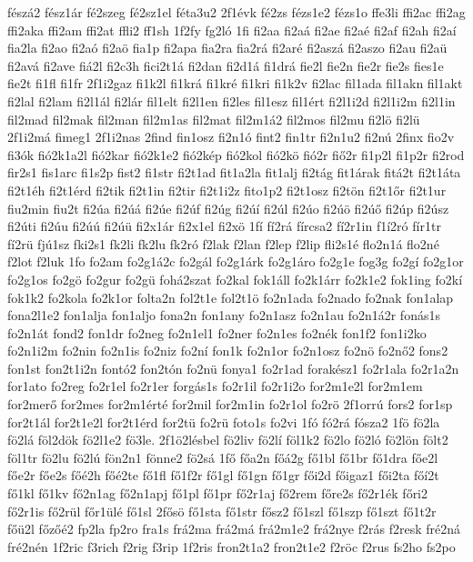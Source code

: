 {fészá2
fész1ár
fé2szeg
fé2sz1el
féta3u2
2f1évk
fé2zs
fézs1e2
fézs1o
ffe3li
ffi2ac
ffi2ag
ffi2aka
ffi2am
ffi2at
ffli2
ff1sh
1f2fy
fg2ló
1fi
fi2aa
fi2aá
fi2ae
fi2aé
fi2af
fi2ah
fi2aí
fia2la
fi2ao
fi2aó
fi2aö
fia1p
fi2apa
fia2ra
fia2rá
fi2aré
fi2aszá
fi2aszo
fi2au
fi2aü
fi2avá
fi2ave
fiá2l
fi2c3h
fici2t1á
fi2dan
fi2d1á
fi1drá
fie2l
fie2n
fie2r
fie2s
fies1e
fie2t
fi1fl
fi1fr
2f1i2gaz
fi1k2l
fi1krá
fi1kré
fi1kri
fi1k2v
fi2lac
fil1ada
fil1akn
fil1akt
fi2lal
fi2lam
fi2l1ál
fi2lár
fil1elt
fi2l1en
fi2les
fil1esz
fil1ért
fi2l1i2d
fi2l1i2m
fi2l1in
fil2mad
fil2mak
fil2man
fil2m1as
fil2mat
fil2m1á2
fil2mos
fil2mu
fi2lö
fi2lü
2f1i2má
fimeg1
2f1i2nas
2find
fin1osz
fi2n1ó
fint2
fin1tr
fi2n1u2
fi2nú
2finx
fio2v
fi3ók
fió2k1a2l
fió2kar
fió2k1e2
fió2kép
fió2kol
fió2kö
fió2r
fiő2r
fi1p2l
fi1p2r
fi2rod
fir2s1
fis1arc
fi1s2p
fist2
fi1str
fi2t1ad
fit1a2la
fit1alj
fi2tág
fit1árak
fitá2t
fi2t1áta
fi2t1éh
fi2t1érd
fi2tik
fi2t1in
fi2tir
fi2t1i2z
fito1p2
fi2t1osz
fi2tön
fi2t1őr
fi2t1ur
fiu2min
fiu2t
fi2úa
fi2úá
fi2úe
fi2úf
fi2úg
fi2úí
fi2úl
fi2úo
fi2úö
fi2úő
fi2úp
fi2úsz
fi2úti
fi2úu
fi2úú
fi2úü
fi2x1ár
fi2x1el
fi2xö
1fí
fí2rá
fírcsa2
fí2r1in
f1í2ró
fír1tr
fí2rü
fjú1sz
fki2s1
fk2li
fk2lu
fk2ró
f2lak
f2lan
f2lep
f2lip
fli2s1é
flo2n1á
flo2né
f2lot
f2luk
1fo
fo2am
fo2g1á2c
fo2gál
fo2g1árk
fo2g1áro
fo2g1e
fog3g
fo2gí
fo2g1or
fo2g1os
fo2gö
fo2gur
fo2gü
fohá2szat
fo2kal
fok1áll
fo2k1árr
fo2k1e2
fok1ing
fo2kí
fok1k2
fo2kola
fo2k1or
folta2n
fol2t1e
fol2t1ö
fo2n1ada
fo2nado
fo2nak
fon1alap
fona2l1e2
fon1alja
fon1aljo
fona2n
fon1any
fo2n1asz
fo2n1au
fo2n1á2r
fonás1s
fo2n1át
fond2
fon1dr
fo2neg
fo2n1el1
fo2ner
fo2n1es
fo2nék
fon1f2
fon1i2ko
fo2n1i2m
fo2nin
fo2n1is
fo2niz
fo2ní
fon1k
fo2n1or
fo2n1osz
fo2nö
fo2nő2
fons2
fon1st
fon2t1i2n
fontó2
fon2tón
fo2nü
fonya1
fo2r1ad
forakész1
fo2r1ala
fo2r1a2n
for1ato
fo2reg
fo2r1el
fo2r1er
forgás1s
fo2r1il
fo2r1i2o
for2m1e2l
for2m1em
for2merő
for2mes
for2m1érté
for2mil
for2m1in
fo2r1ol
fo2rö
2f1orrú
fors2
for1sp
for2t1ál
for2t1e2l
for2t1érd
for2tü
fo2rü
foto1s
fo2vi
1fó
fó2rá
fósza2
1fö
fö2la
fö2lá
föl2dök
fö2l1e2
fö3le.
2f1ö2lésbel
fö2liv
fö2lí
föl1k2
fö2lo
fö2ló
fö2lön
fölt2
föl1tr
fö2lu
fö2lú
fön2n1
fönne2
fö2sá
1fő
főa2n
főá2g
fő1bl
fő1br
fő1dra
főe2l
főe2r
főe2s
főé2h
főé2te
fő1fl
fő1f2r
fő1gl
fő1gn
fő1gr
fői2d
főigaz1
fői2ta
főí2t
fő1kl
fő1kv
fő2n1ag
fő2n1apj
fő1pl
fő1pr
fő2r1aj
fő2rem
főre2s
fő2r1ék
főri2
fő2r1is
fő2rül
főr1ülé
fő1sl
2fősö
fő1sta
fő1str
fősz2
fő1szl
fő1szp
fő1szt
fő1t2r
főü2l
főzőé2
fp2la
fp2ro
fra1s
frá2ma
frá2má
frá2m1e2
frá2nye
f2rás
f2resk
fré2ná
fré2nén
1f2ric
f3rich
f2rig
f3rip
1f2ris
fron2t1a2
fron2t1e2
f2röc
f2rus
fs2ho
fs2po
}
